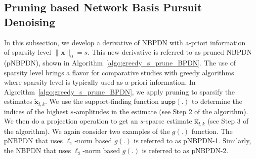 \documentclass[journal]{IEEEtran}
\newcommand{\mbx}{\mathbf{x}}
\newcommand{\supp}{\ensuremath{\texttt{supp}}}
\begin{document}
\subsection{Pruning based Network Basis Pursuit Denoising}

In this subsection, we develop a derivative of NBPDN with a-priori information of sparsity level $\| \mbx \|_0 =s$. This new derivative is referred to as pruned NBPDN (pNBPDN), shown in Algorithm~\ref{algo:greedy_s_prune_BPDN}. The use of sparsity level brings a flavor for comparative studies with greedy algorithms where sparsity level is typically used as a-priori information. In Algorithm~\ref{algo:greedy_s_prune_BPDN}, we apply pruning to sparsify the estimates $\tilde{\mbx}_{l,k}$. We use the support-finding function $\supp(.)$ to determine the indices of the highest $s$-amplitudes in the estimate (see Step 2 of the algorithm). We then do a projection operation to get an $s$-sparse estimate $\hat{\mbx}_{l,k}$ (see Step 3 of the algorithm). We again consider two examples of the $g(.)$ function. The pNBPDN that uses $\ell_1$-norm based $g(.)$ is referred to as pNBPDN-1. Similarly,  the NBPDN that uses $\ell_2$-norm based $g(.)$ is referred to as pNBPDN-2. 
\end{document}
